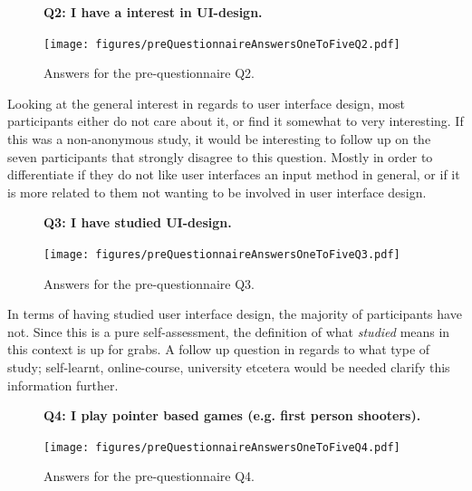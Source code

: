 \documentclass[nofilelist,dvipsnames]{cslthse-msc}
\begin{document}
				\begin{figure}[h!]
          \textbf{Q2: I have a interest in UI-design.}
          \begin{center}
            \texttt{[image: figures/preQuestionnaireAnswersOneToFiveQ2.pdf]}
            \vspace{-1cm}
            \caption{Answers for the pre-questionnaire Q2.}
          \end{center}
				\end{figure}

        Looking at the general interest in regards to user interface design,
        most participants either do not care about it, or find it somewhat to
        very interesting. If this was a non-anonymous study, it would be
        interesting to follow up on the seven participants that strongly
        disagree to this question. Mostly in order to differentiate if they do
        not like user interfaces an input method in general, or if it is more
        related to them not wanting to be involved in user interface design.

				\begin{figure}[h!]
          \textbf{Q3: I have studied UI-design.}
          \begin{center}
            \texttt{[image: figures/preQuestionnaireAnswersOneToFiveQ3.pdf]}
            \vspace{-1cm}
            \caption{Answers for the pre-questionnaire Q3.}
          \end{center}
				\end{figure}

        In terms of having studied user interface design, the majority of
        participants have not. Since this is a pure self-assessment, the
        definition of what \textit{studied} means in this context is up for
        grabs. A follow up question in regards to what type of study;
        self-learnt, online-course, university etcetera would be needed clarify
        this information further.

				\begin{figure}[h!]
          \textbf{Q4: I play pointer based games (e.g. first person shooters).}
          \begin{center}
            \texttt{[image: figures/preQuestionnaireAnswersOneToFiveQ4.pdf]}
            \vspace{-1cm}
            \caption{Answers for the pre-questionnaire Q4.}
          \end{center}
				\end{figure}
\end{document}
